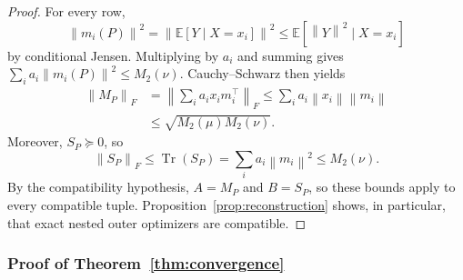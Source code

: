 \documentclass[11pt]{article}
\newcommand{\E}{\mathbb E}
\newcommand{\norm}[1]{\left\lVert #1\right\rVert}
\DeclareMathOperator{\Tr}{Tr}
\theoremstyle{plain}
\theoremstyle{definition}
\theoremstyle{remark}
\begin{document}
\begin{proof}
For every row,
\[
 \norm{m_i(P)}^2
 =\norm{\E[Y\mid X=x_i]}^2
 \le\E[\norm Y^2\mid X=x_i]
\]
by conditional Jensen.  Multiplying by $a_i$ and summing gives
$\sum_i a_i\norm{m_i(P)}^2\le M_2(\nu)$.  Cauchy--Schwarz then yields
\begin{align*}
 \norm{M_P}_F
 &=\norm{\sum_i a_ix_im_i^\top}_F
 \le\sum_i a_i\norm{x_i}\norm{m_i}\\
 &\le\sqrt{M_2(\mu)M_2(\nu)}.
\end{align*}
Moreover, $S_P\succeq0$, so
\[
 \norm{S_P}_F\le\Tr(S_P)=\sum_i a_i\norm{m_i}^2\le M_2(\nu).
\]
By the compatibility hypothesis, $A=M_P$ and $B=S_P$, so these bounds
apply to every compatible tuple. Proposition~\ref{prop:reconstruction} shows, in
particular, that exact nested outer optimizers are compatible.
\end{proof}

\subsubsection{Proof of Theorem~\ref{thm:convergence}}\label{proof:11.3}
\end{document}
